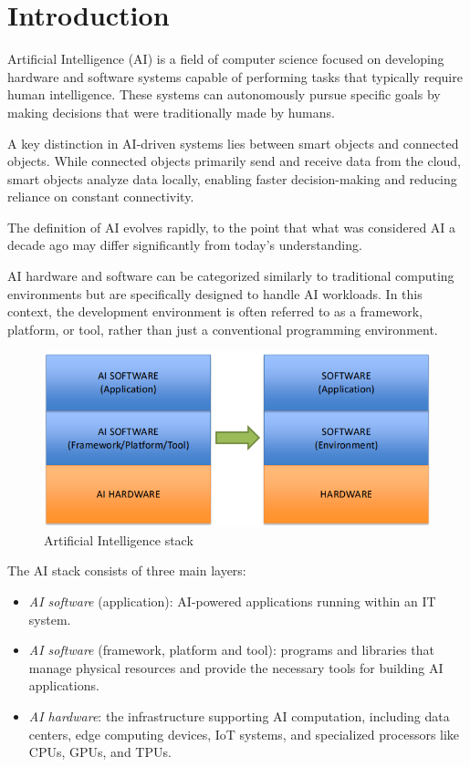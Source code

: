 \section{Introduction}

Artificial Intelligence (AI) is a field of computer science focused on developing hardware and software systems capable of performing tasks that typically require human intelligence. 
These systems can autonomously pursue specific goals by making decisions that were traditionally made by humans.

A key distinction in AI-driven systems lies between smart objects and connected objects.
While connected objects primarily send and receive data from the cloud, smart objects analyze data locally, enabling faster decision-making and reducing reliance on constant connectivity.

The definition of AI evolves rapidly, to the point that what was considered AI a decade ago may differ significantly from today's understanding.

AI hardware and software can be categorized similarly to traditional computing environments but are specifically designed to handle AI workloads. 
In this context, the development environment is often referred to as a framework, platform, or tool, rather than just a conventional programming environment.
\begin{figure}[H]
    \centering
    \includegraphics[width=0.5\linewidth]{images/eeai1.png}
    \caption{Artificial Intelligence stack}
\end{figure}
The AI stack consists of three main layers:
\begin{itemize}
    \item \textit{AI software} (application): AI-powered applications running within an IT system.
    \item \textit{AI software} (framework, platform and tool): programs and libraries that manage physical resources and provide the necessary tools for building AI applications.
    \item \textit{AI hardware}: the infrastructure supporting AI computation, including data centers, edge computing devices, IoT systems, and specialized processors like CPUs, GPUs, and TPUs.
\end{itemize}